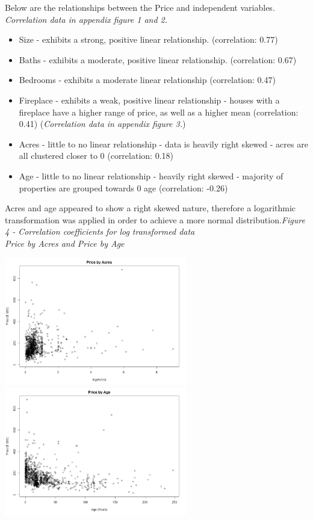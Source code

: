 \documentclass[10pt,A4,makeidx]{article}
\begin{document}
  Below are the relationships between the Price and independent variables.\\
  \emph{Correlation data in appendix figure 1 and 2.}
  \begin{itemize}
    \item Size - exhibits a strong, positive linear relationship. (correlation: 0.77)
    \item Baths - exhibits a moderate, positive linear relationship. (correlation: 0.67)
    \item Bedrooms - exhibits a moderate linear relationship (correlation: 0.47)
    \item Fireplace - exhibits a weak, positive linear relationship - houses 
    with a fireplace have a higher range of price, as well as a higher mean (correlation: 0.41)
    (\emph{Correlation data in appendix figure 3.})
    \item Acres - little to no linear relationship - data is heavily right skewed 
      \subitem - acres are all clustered closer to 0 (correlation: 0.18)
    \item Age - little to no linear relationship - heavily right skewed
      \subitem - majority of properties are grouped
    towards 0 age (correlation: -0.26)
  \end{itemize}
  
  Acres and age appeared to show a right skewed nature, therefore a logarithmic transformation was applied
  in order to achieve a more normal distribution.\emph{Figure 4 - Correlation coefficients for log transformed data}\\
  
  \emph{Price by Acres and Price by Age}\\
  \begin{center}
    \includegraphics[width=8cm]{price-acres.png}
    \includegraphics[width=8cm]{price-age.png}
  \end{center}
  
\end{document}
